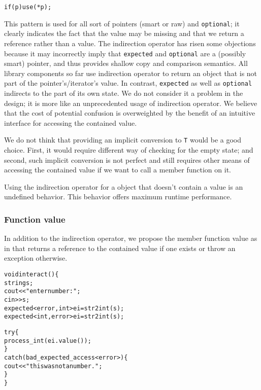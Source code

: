 \documentclass[a4paper,10pt]{article}
\newcommand{\cpp}[1]{\lstinline{#1}}
\newcommand{\suppress}[1]{\colorbox{suppress_color}{#1}}
\newcommand{\update}[1]{\colorbox{update_color}{#1}}
\begin{document}
\begin{alltt}
if (p) use(*p);
\end{alltt}

This pattern is used for all sort of pointers (smart or raw) and \cpp{optional}; it clearly indicates the fact that the value may be missing and that we return a reference rather than a value. The indirection operator has risen some objections because it may incorrectly imply that \cpp{expected} and \cpp{optional} are a (possibly smart) pointer, and thus provides shallow copy and comparison semantics. All library components so far use indirection operator to return an object that is not part of the pointer's/iterator's value. In contrast, \cpp{expected} as well as \cpp{optional} indirects to the part of its own state. We do not consider it a problem in the design; it is more like an unprecedented usage of indirection operator. We believe that the cost of potential confusion is overweighted by the benefit of an intuitive interface for accessing the contained value.

We do not think that providing an implicit conversion to \cpp{T} would be a good choice. First, it would require different way of checking for the empty state; and second, such implicit conversion is not perfect and still requires other means of accessing the contained value if we want to call a member function on it.

Using the indirection operator for a object that doesn't contain a value is an undefined behavior. This behavior offers maximum runtime performance.

\subsubsection{Function value}

In addition to the indirection operator, we propose the member function value as in \cite{OptionalRev4} that returns a reference to the contained value if one exists or throw an exception otherwise.

\begin{alltt}
void interact() \{
  string s;
  cout << "enter number: ";
  cin >> s;
\suppress{  expected<error,int> ei = str2int(s);}
\update{  expected<int, error> ei = str2int(s);}
  
  try \{
    process_int(ei.value());
  \}
  catch(bad_expected_access<error>) \{
    cout << "this was not a number.";
  \}
\}
\end{alltt}
\end{document}
